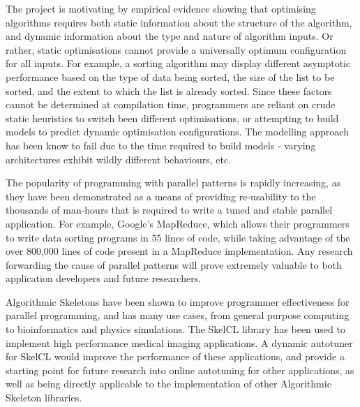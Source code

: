 The project is motivating by empirical evidence showing that
optimising algorithms requires both static information about the
structure of the algorithm, and dynamic information about the type and
nature of algorithm inputs. Or rather, static optimisations cannot
provide a universally optimum configuration for all inputs. For
example, a sorting algorithm may display different asymptotic
performance based on the type of data being sorted, the size of the
list to be sorted, and the extent to which the list is already
sorted. Since these factors cannot be determined at compilation time,
programmers are reliant on crude static heuristics to switch been
different optimisations, or attempting to build models to predict
dynamic optimisation configurations. The modelling approach has been
know to fail due to the time required to build models - varying
architectures exhibit wildly different behaviours, etc.



The popularity of programming with parallel patterns is rapidly
increasing, as they have been demonstrated as a means of providing
re-usability to the thousands of man-hours that is required to write a
tuned and stable parallel application. For example, Google's
MapReduce, which allows their programmers to write data sorting
programs in 55 lines of code, while taking advantage of the over
800,000 lines of code present in a MapReduce implementation. Any
research forwarding the cause of parallel patterns will prove
extremely valuable to both application developers and future
researchers.

Algorithmic Skeletons have been shown to improve programmer
effectiveness for parallel programming, and has many use cases, from
general purpose computing to bioinformatics and physics
simulations. The SkelCL library has been used to implement high
performance medical imaging applications. A dynamic autotuner for
SkelCL would improve the performance of these applications, and
provide a starting point for future research into online autotuning
for other applications, as well as being directly applicable to the
implementation of other Algorithmic Skeleton libraries.


